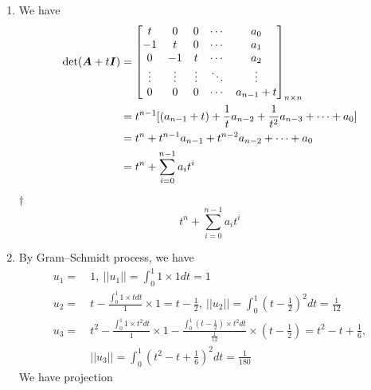 \documentclass[a4paper,12pt]{article}
\begin{document}
\begin{enumerate}
    \item We have \begin{equation}
        \begin{aligned}
            \det(\boldsymbol{A} + t\boldsymbol{I}) & = \begin{bmatrix}
                t & 0 & 0 & \cdots & a_0 \\
                -1 & t & 0 & \cdots & a_1 \\
                0 & -1 & t & \cdots & a_2 \\
                \vdots & \vdots & \vdots & \ddots & \vdots \\
                0 & 0 & 0 & \cdots & a_{n - 1} + t
            \end{bmatrix}_{n \times n} \\
            & = t^{n - 1}[(a_{n - 1} + t) + \frac{1}{t}a_{n - 2} + \frac{1}{t^2}a_{n - 3} + \cdots + a_0] \\
            & = t^n + t^{n - 1}a_{n - 1} + t^{n - 2}a_{n - 2} + \cdots + a_0 \\
            & = t^n + \sum_{i = 0}^{n - 1}a_it^{i}
        \end{aligned}
    \end{equation}
    \begin{answer}{$\dag$}\begin{equation}
            t^n + \sum_{i = 0}^{n - 1}a_it^{i}
        \end{equation}
    \end{answer}
    \item By Gram–Schmidt process, we have \begin{equation}
        \begin{aligned}
            u_1 = & \ 1, \ ||u_1|| = \int_{0}^{1}1 \times 1dt = 1 \\
            u_2 = & \ t - \frac{\int_{0}^{1}1 \times tdt}{1} \times 1= t - \frac{1}{2}, \ ||u_2|| = \int_{0}^{1}(t - \frac{1}{2})^2dt = \frac{1}{12} \\
            u_3 = & \ t^2 - \frac{\int_{0}^{1}1 \times t^2dt}{1} \times 1 - \frac{\int_{0}^{1}(t - \frac{1}{2}) \times t^2dt}{\frac{1}{12}} \times (t - \frac{1}{2})= t^2 - t + \frac{1}{6}, \\
            & \ ||u_3|| = \int_{0}^{1}(t^2 - t + \frac{1}{6})^2dt = \frac{1}{180}
        \end{aligned}
    \end{equation} We have projection \begin{equation}
        \begin{aligned}

\end{aligned}
\end{equation}
\end{enumerate}
\end{document}
